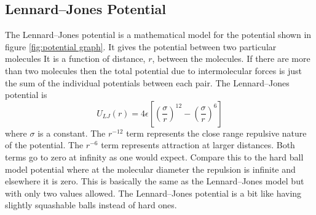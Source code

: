 \documentclass{article}
\begin{document}
    \subsection{Lennard--Jones Potential}
    The Lennard--Jones potential is a mathematical model for the potential shown in figure \ref{fig:potential graph}.
    It gives the potential between two particular molecules
    It is a function of distance, \(r\), between the molecules.
    If there are more than two molecules then the total potential due to intermolecular forces is just the sum of the individual potentials between each pair.
    The Lennard--Jones potential is
    \[U_{LJ}(r) = 4\epsilon\left[\left(\frac{\sigma}{r}\right)^{12} - \left(\frac{\sigma}{r}\right)^6\right]\]
    where \(\sigma\) is a constant.
    The \(r^{-12}\) term represents the close range repulsive nature of the potential.
    The \(r^{-6}\) term represents attraction at larger distances.
    Both terms go to zero at infinity as one would expect.
    Compare this to the hard ball model potential where at the molecular diameter the repulsion is infinite and elsewhere it is zero.
    This is basically the same as the Lennard--Jones model but with only two values allowed.
    The Lennard--Jones potential is a bit like having slightly squashable balls instead of hard ones.
    
\end{document}
